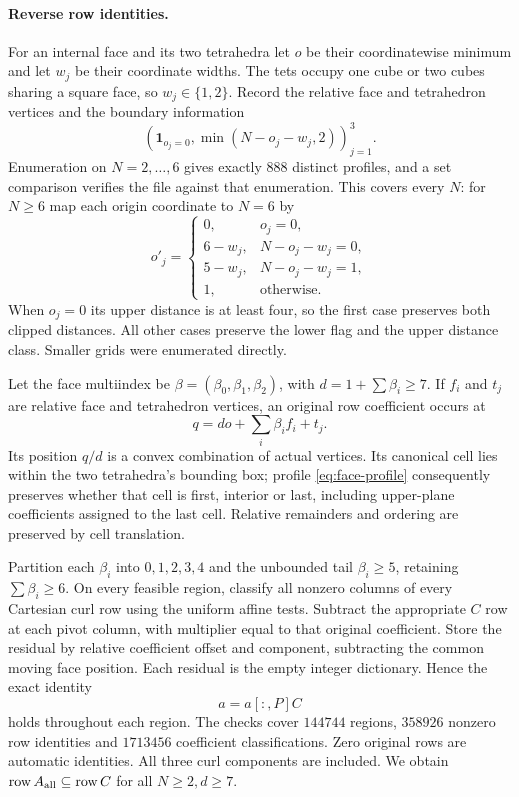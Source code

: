 \documentclass[11pt]{article}
\theoremstyle{remark}
\DeclareMathOperator{\row}{row}
\begin{document}
\paragraph{Reverse row identities.}
For an internal face and its two tetrahedra let $o$ be their coordinatewise
minimum and let $w_j$ be their coordinate widths. The tets occupy one cube
or two cubes sharing a square face, so $w_j\in\{1,2\}$. Record the
relative face and tetrahedron vertices and the boundary information
\begin{equation}\label{eq:face-profile}
 (\mathbf1_{o_j=0},\min(N-o_j-w_j,2))_{j=1}^3.
\end{equation}
Enumeration on $N=2,\ldots,6$ gives exactly $888$ distinct profiles,
and a set comparison verifies the file against that enumeration. This
covers every $N$: for $N\ge6$ map each origin coordinate to $N=6$ by
\[
 o'_j=\begin{cases}
 0,&o_j=0,\\
 6-w_j,&N-o_j-w_j=0,\\
 5-w_j,&N-o_j-w_j=1,\\
 1,&\text{otherwise}.
 \end{cases}
\]
When $o_j=0$ its upper distance is at least four, so the first case
preserves both clipped distances. All other cases preserve the lower
flag and the upper distance class. Smaller grids were enumerated directly.

Let the face multiindex be $\beta=(\beta_0,\beta_1,\beta_2)$, with
$d=1+\sum\beta_i\ge7$. If $f_i$ and $t_j$ are relative face and
tetrahedron vertices, an original row coefficient occurs at
\begin{equation}\label{eq:face-site}
 q=do+\sum_i\beta_i f_i+t_j.
\end{equation}
Its position $q/d$ is a convex combination of actual vertices. Its
canonical cell lies within the two tetrahedra's bounding box; profile
\eqref{eq:face-profile} consequently preserves whether that cell is first,
interior or last, including upper-plane coefficients assigned to the last
cell. Relative remainders and ordering are preserved by cell translation.

Partition each $\beta_i$ into $0,1,2,3,4$ and the unbounded tail
$\beta_i\ge5$, retaining $\sum\beta_i\ge6$. On every feasible region,
classify all nonzero columns of every Cartesian curl row using the
uniform affine tests. Subtract the appropriate $C$ row at each pivot
column, with multiplier equal to that original coefficient. Store the
residual by relative coefficient offset and component, subtracting the
common moving face position. Each residual is the empty integer
dictionary. Hence the exact identity
\begin{equation}\label{eq:reverse}
 a=a[:,P]C
\end{equation}
holds throughout each region. The checks cover $144744$ regions,
$358926$ nonzero row identities and $1713456$ coefficient classifications.
Zero original rows are automatic identities. All three curl components
are included. We obtain $\row A_{\rm all}\subseteq\row C$ for all
$N\ge2,d\ge7$.
\end{document}
